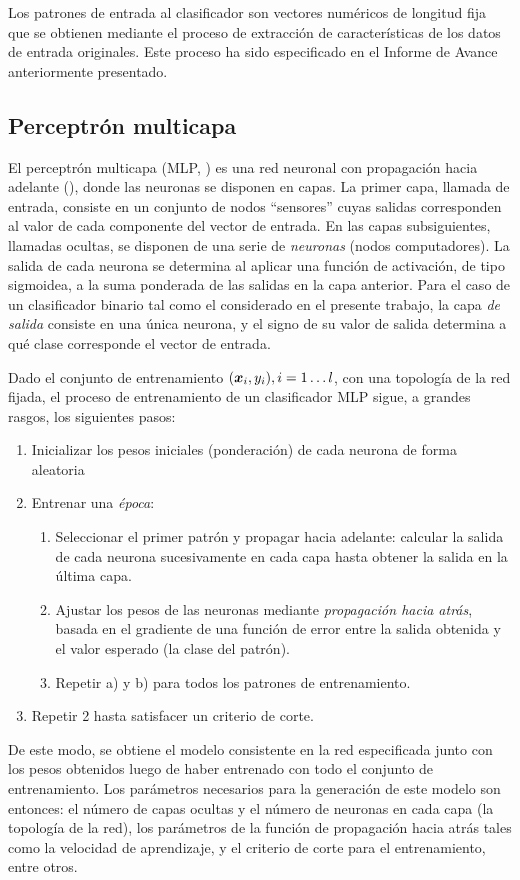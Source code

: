 \documentclass[12pt,bibliography=oldstyle,DIV=12,parskip=half-,titlepage]{scrartcl}
\begin{document}
Los patrones de entrada al clasificador son vectores numéricos de
longitud fija que se obtienen mediante el proceso de extracción de
características de los datos de entrada originales. Este proceso ha
sido especificado en el Informe de Avance anteriormente presentado.
%
%
\subsection{Perceptrón multicapa}
%
El perceptrón multicapa (MLP, )
\cite{mlp1,mlp2} es una red neuronal con propagación hacia adelante
(), donde las neuronas se disponen en capas. La
primer capa, llamada de entrada, consiste en un conjunto de nodos
``sensores'' cuyas salidas corresponden al valor de cada componente
del vector de entrada. En las capas subsiguientes, llamadas
{ocultas}, se disponen de una serie de \emph{neuronas} (nodos
computadores).  La salida de cada neurona se determina al aplicar una
función de activación, de tipo sigmoidea, a la suma ponderada de las
salidas en la capa anterior.  Para el caso de un clasificador binario
tal como el considerado en el presente trabajo, la capa \emph{de
  salida} consiste en una única neurona, y el signo de su valor de
salida determina a qué clase corresponde el vector de entrada.

Dado el conjunto de entrenamiento $(\boldsymbol{x}_i, y_i), i=1\ldots l$, con
una topología de la red fijada, el proceso de entrenamiento de un
clasificador MLP sigue, a grandes rasgos, los siguientes pasos:
\begin{enumerate}
\item Inicializar los pesos iniciales (ponderación) de cada neurona de
  forma aleatoria
\item Entrenar una \emph{época}:
  \begin{enumerate}
  \item Seleccionar el primer patrón y propagar hacia adelante: calcular
    la salida de cada neurona sucesivamente en cada capa hasta obtener
    la salida en la última capa.
  \item Ajustar los pesos de las neuronas mediante \emph{propagación hacia
    atrás}, basada en el gradiente de una función de error entre la salida
    obtenida y el valor esperado (la clase del patrón).
  \item Repetir a) y b) para todos los patrones de entrenamiento.
  \end{enumerate}
  \item Repetir 2 hasta satisfacer un criterio de corte.
\end{enumerate}
De este modo, se obtiene el modelo consistente en la red especificada
junto con los pesos obtenidos luego de haber entrenado con todo el
conjunto de entrenamiento. Los parámetros necesarios para la
generación de este modelo son entonces: el número de capas ocultas y
el número de neuronas en cada capa (la topología de la red), los
parámetros de la función de propagación hacia atrás tales como
la velocidad de aprendizaje, y el criterio de corte para
el entrenamiento, entre otros.
%
%
\end{document}
